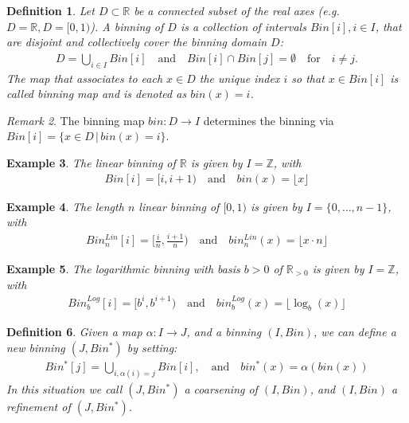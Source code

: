 \documentclass{article}
\theoremstyle{plain}
\newtheorem{definition}{Definition}[section]
\newtheorem{example}[definition]{Example}
\theoremstyle{remark}
\newtheorem{remark}[definition]{Remark}
\newcommand{\IR}{\mathbb{R}}
\newcommand{\IZ}{\mathbb{Z}}
\newcommand{\Union}{\bigcup}
\newcommand{\qtext}[1]{\quad\text{#1}\quad} %
\newcommand{\ra}{\rightarrow}
\newcommand{\floor}[1]{\lfloor#1\rfloor}
\begin{document}
\begin{definition}
  Let $D \subset \IR$ be a connected subset of the real axes (e.g. $D=\IR, D=[0,1)$).
  A binning of $D$ is a collection of intervals $Bin[i], i \in I$, that are disjoint and collectively cover the binning domain $D$:
  \begin{align*}
    D = \Union_{i\in I} Bin[i] \qtext{and} Bin[i] \cap Bin[j] = \emptyset \qtext{for} i \neq j.
  \end{align*}
  The map that associates to each $x \in D$ the unique index $i$ so that $x \in Bin[i]$ is called
  binning map and is denoted as $bin(x) = i$.
\end{definition}

\begin{remark}
  The binning map $bin: D \ra I$ determines the binning via $Bin[i] = \{ x \in D \,|\, bin(x) = i \}$.
\end{remark}

\begin{example}
  The linear binning of $\IR$ is given by $I = \IZ$, with
  \begin{align*}
    Bin[i] = [i, i+1)  \qtext{and} bin(x)=\floor{x}
  \end{align*}
\end{example}

\begin{example}
  The length $n$ linear binning of $[0,1)$ is given by $I = \{0, \dots, n-1\}$, with
    \begin{align*}
      Bin^{Lin}_n[i]   = [ \frac{i}{n}, \frac{i+1}{n} )
      \qtext{and}
      bin^{Lin}_n(x) = \floor{x \cdot n}
    \end{align*}
\end{example}

\begin{example}\label{example:log}
  The logarithmic binning with basis $b > 0$ of $\IR_{>0}$ is given by $I=\IZ$, with
  \begin{align*}
    Bin^{Log}_b[i] = [b^i, b^{i+1})
    \qtext{and}
    bin^{Log}_b(x)=\floor{\log_b(x)}
  \end{align*}
\end{example}

\begin{definition}\label{ref}
  Given a map $\alpha: I \ra J$, and a binning $(I, Bin)$, we can define a new binning
  $(J, Bin^*)$ by setting:
  \begin{align*}
    Bin^*[j] = \Union_{i, \alpha(i) = j} Bin[i], \qtext{and} bin^*(x) = \alpha(bin(x))
  \end{align*}
  In this situation we call $(J, Bin^*)$ a coarsening of $(I, Bin)$, and $(I, Bin)$ a refinement of $(J, Bin^*)$.
\end{definition}
\end{document}
